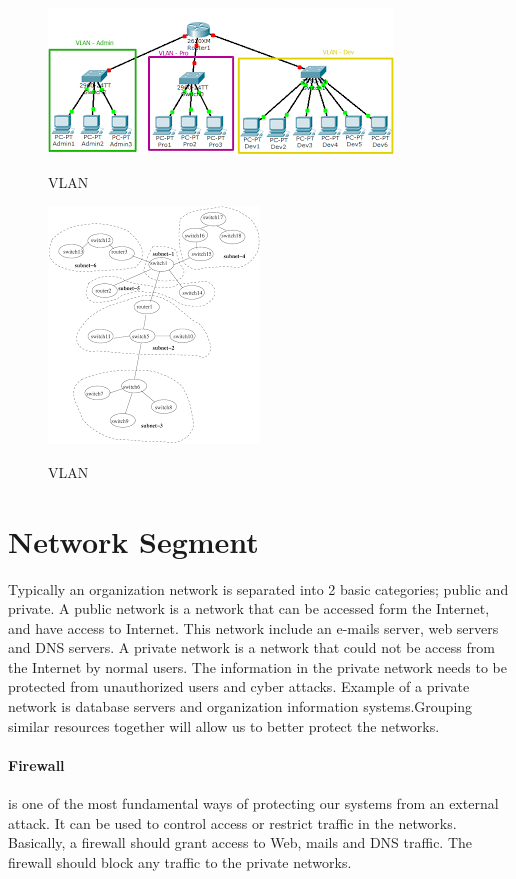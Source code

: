 \documentclass[7x9]{times}
\begin{document}
\begin{figure}
\includegraphics{vlan1.png}
\label{fig:vlan1}
\caption{VLAN}
\end{figure}

\begin{figure}
\includegraphics{vlan2.png}
\label{fig:vlan2}
\caption{VLAN}
\end{figure}

\section{Network Segment}

Typically an organization network is separated into 2 basic
categories; public and private. A public network is a
network that can be accessed form the Internet, and have
access to Internet. This network include an e-mails server,
web servers and DNS servers. A private network is a network
that could not be access from the Internet by normal users.
The information in the private network needs to be protected
from unauthorized users and cyber attacks. Example of a 
private network is database servers and organization 
information systems.Grouping similar resources together 
will allow us to better 
protect the networks.

\paragraph{Firewall} is one of the most fundamental ways of
protecting our systems from an external attack. It can be
used to control access or restrict traffic in the networks.
Basically, a firewall should grant access to Web, mails and
DNS traffic. The firewall should block any traffic to the
private networks.
\end{document}
